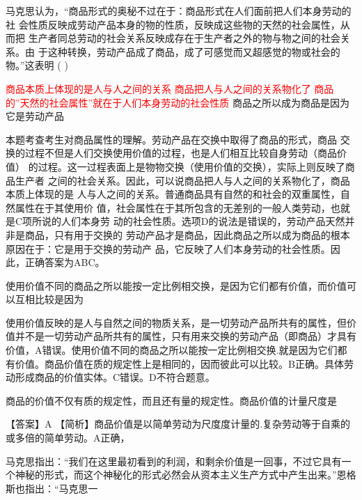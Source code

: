 \question 马克思认为，``商品形式的奥秘不过在于：商品形式在人们面前把人们本身劳动的社
会性质反映成劳动产品本身的物的性质，反映成这些物的天然的社会属性，从而把
生产者同总劳动的社会关系反映成存在于生产者之外的物与物之间的社会关系。由
于这种转换，劳动产品成了商品，成了可感觉而又超感觉的物或社会的物。''这表明
( )
\par\fourch
{\textcolor{red}{商品本质上体现的是人与人之间的关系}}
{\textcolor{red}{商品把人与人之间的关系物化了}}
{\textcolor{red}{商品的”天然的社会属性”就在于人们本身劳动的社会性质}}
{商品之所以成为商品是因为它是劳动产品}
\begin{solution}本题考查考生对商品属性的理解。劳动产品在交换中取得了商品的形式，商品
交换的过程不但是人们交换使用价值的过程，也是人们相互比较自身劳动（商品价值）
的过程。这一过程表面上是物物交换（使用价值的交换），实际上则反映了商品生产者
之间的社会关系。因此，可以说商品把人与人之间的关系物化了，商品本质上体现的是
人与人之间的关系。普通商品具有自然的和社会的双重属性，自然属性在于其使用价
值，社会属性在于其所包含的无差别的一般人类劳动，也就是C项所说的人们本身劳
动的社会性质。选项D的说法是错误的，劳动产品天然并非是商品，只有用于交换的
劳动产品才是商品，因此商品之所以成为商品的根本原因在于：它是用于交换的劳动产
品，它反映了人们本身劳动的社会性质。因此，正确答案为ABC。
\end{solution}
\question 使用价值不同的商品之所以能按一定比例相交换，是因为它们都有价值，而价值可以互相比较是因为
\par{}
\begin{solution}使用价值反映的是人与自然之间的物质关系，是一切劳动产品所共有的属性，但价值并不是一切劳动产品所共有的属性，只有用来交换的劳动产品（即商品）才具有价值，A错误。使用价值不同的商品之所以能按一定比例相交换.就是因为它们都有价值。商品价值在质的规定性上是相同的，因而彼此可以比较。B正确。具体劳动形成商品的价值实体。C错误。D不符合题意。
\end{solution}
\question 商品的价值不仅有质的规定性，而且还有量的规定性。商品价值的计量尺度是
\par{}
\begin{solution}【答案】A
【简析】商品价值是以简单劳动为尺度度计量的.复杂劳动等于自乘的或多倍的简单劳动。A正确，
\end{solution}
\question 马克思指出：``我们在这里最初看到的利润，和剩余价值是一回事，不过它具有一个神秘的形式，而这个神秘化的形式必然会从资本主义生产方式中产生出来。''恩格斯也指出：``马克思一
